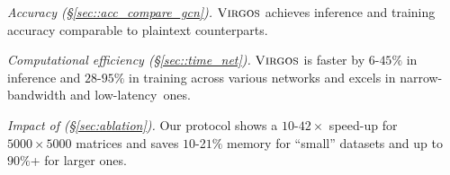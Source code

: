\textit{Accuracy (\S\ref{sec::acc_compare_gcn}).}
$\textnormal{\textsc{Virgos}}$ achieves inference and training accuracy comparable to plaintext counterparts.

{\textit{Computational efficiency (\S\ref{sec::time_net}).}} 
$\textnormal{\textsc{Virgos}}$ is faster by $6$-$45\%$ in inference and $28$-$95\%$ in training across various networks and excels in narrow-bandwidth and low-latency~ones.

{\textit{Impact of \osmm (\S\ref{sec:ablation}).}}
Our \osmm protocol shows a $10$-$42\times$ speed-up for $5000\times 5000$ matrices and saves $10$-2$1\%$ memory for ``small'' datasets and up to $90\%$+ for larger ones.
